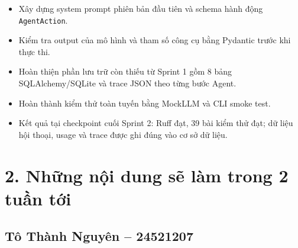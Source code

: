 \documentclass[12pt,a4paper]{article}
\begin{document}
\begin{itemize}
    \item Xây dựng system prompt phiên bản đầu tiên và schema hành động \texttt{AgentAction}.

    \item Kiểm tra output của mô hình và tham số công cụ bằng Pydantic trước khi thực thi.

    \item Hoàn thiện phần lưu trữ còn thiếu từ Sprint 1 gồm 8 bảng SQLAlchemy/SQLite và trace JSON theo từng bước Agent.

    \item Hoàn thành kiểm thử toàn tuyến bằng MockLLM và CLI smoke test.

    \item Kết quả tại checkpoint cuối Sprint 2: Ruff đạt, 39 bài kiểm thử đạt; dữ liệu hội thoại, usage và trace được ghi đúng vào cơ sở dữ liệu.
\end{itemize}

\section*{2. Những nội dung sẽ làm trong 2 tuần tới}

\subsection*{Tô Thành Nguyên -- 24521207}
\end{document}

